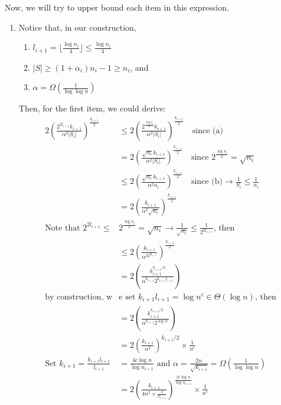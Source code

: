\documentclass[a4paper, english]{paper}
\begin{document}
	Now, we will try to upper bound each item in this expression.
	\begin{enumerate}
		\item Notice that, in our construction, 
		\begin{enumerate}
			\item $l_{i+1} = \lfloor\frac{\log n_i}{4}\rfloor\le\frac{\log n_i}{4}$
			\item $|S|\ge (1+\alpha_i)n_i-1\ge n_i$, and
			\item $\alpha = \Omega(\frac1{\log\log n})$
		\end{enumerate}\par
		Then, for the first item, we could derive:
		\begin{align*}
		2\left(\frac{2^{2l_{i+1}}k_{i+1}}{\alpha^2 |S_i|}\right)^{\frac{k_{i+1}}2}&\le 2\left(\frac{2^{\frac{\log n_i}{2}}k_{i+1}}{\alpha^2 |S_i|}\right)^{\frac{k_{i+1}}2}\quad\text{since (a)}\\
		& = 2\left(\frac{\sqrt{n_i}k_{i+1}}{\alpha^2 |S_i|}\right)^{\frac{k_{i+1}}2}\quad\text{since }2^{\frac{\log n_i}{2}} = \sqrt{n_i} \\
		& \le 2\left(\frac{\sqrt{n_i}k_{i+1}}{\alpha^2 n_i}\right)^{\frac{k_{i+1}}2}\quad\text{since (b)}\rightarrow\frac1{S_i}\le\frac1{n_i}\\
		& = 2\left(\frac{k_{i+1}}{\alpha^2\sqrt{n_i}}\right)^{\frac{k_{i+1}}2}\\
		\text{Note that }2^{2l_{i+1}}\le&2^{\frac{\log n_i}{2}} = \sqrt{n_i}\rightarrow \frac1{\sqrt{n_i}}\le\frac1{2^{2l_{i+1}}}\text{, then}\\
		& \le 2\left(\frac{k_{i+1}}{\alpha^22^{2l_{i+1}}}\right)^{\frac{k_{i+1}}2}\\
		& =  2\left(\frac{k_{i+1}^{k_{i+1}/2}}{\alpha^{k_{i+1}}2^{k_{i+1}l_{i+1}}}\right)\\
		\text{by construction, w}&\text{e set } k_{i+1}l_{i+1} = \log n^c \in \Theta(\log n )\text{, then}\\
		& =  2\left(\frac{k_{i+1}^{k_{i+1}/2}}{\alpha^{k_{i+1}}2^{\log n^c}}\right)\\
		& =  2\left(\frac{k_{i+1}}{\alpha^2}\right)^{k_{i+1}/2}\times\frac1{n^c}\\
		\text{Set } k_{i+1} = \frac{k_{i+1}l_{i+1}}{l_{i+1}}&=\frac{4c\log n}{\log n_{i+1}}\text{ and }\alpha = \frac{2n}{\sqrt{k_{i+1}}}=\Omega(\frac1{\log\log n})\\
		& = 2\left(\frac{k_{i+1}}{4n^2\times\frac1{k_{i+1}}}\right)^{\frac{2c\log n}{\log n_{i+1}}}\times\frac1{n^c}\\

\end{align*}
\end{enumerate}
\end{document}
